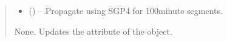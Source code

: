 \documentclass[letterpaper,10pt,english]{sphinxmanual}
\begin{document}
\begin{fulllineitems}
\begin{fulllineitems}
\begin{quote}
\begin{description}
\begin{itemize}
\item {} 
\sphinxAtStartPar
{} () – Propagate using SGP4 for 100\sphinxhyphen{}minute segments.

\end{itemize}

\sphinxAtStartPar
None. Updates the  attribute of the object.

\end{description}\end{quote}

\end{fulllineitems}


\end{fulllineitems}

\end{document}
